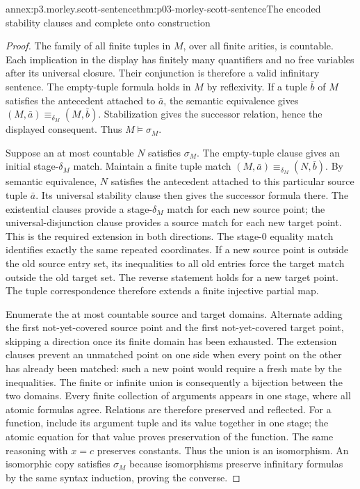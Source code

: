 \begin{annexitem}{annex:p3.morley.scott-sentence}{thm:p03-morley-scott-sentence}{The encoded stability clauses and complete onto construction}
\begin{proof}
The family of all finite tuples in \(M\), over all
finite arities, is countable.
Each implication in the display has finitely many
quantifiers and no free variables after its universal
closure. Their conjunction is therefore a valid
infinitary sentence.
The empty-tuple formula holds in \(M\) by reflexivity.
If a tuple \(\bar b\) of \(M\) satisfies the antecedent
attached to \(\bar a\), the semantic equivalence
gives \((M,\bar a)\equiv_{\delta_M}(M,\bar b)\).
Stabilization gives the successor relation, hence
the displayed consequent. Thus \(M\models\sigma_M\).

Suppose an at most countable \(N\) satisfies \(\sigma_M\).
The empty-tuple clause gives an initial
stage-\(\delta_M\) match.
Maintain a finite tuple match
\((M,\bar a)\equiv_{\delta_M}(N,\bar b)\).
By semantic equivalence, \(N\) satisfies the
antecedent attached to this particular source
tuple \(\bar a\). Its universal stability clause
then gives the successor formula there.
The existential clauses provide a
stage-\(\delta_M\) match for each new source point;
the universal-disjunction clause provides a source
match for each new target point.
This is the required extension in both directions.
The stage-\(0\) equality match identifies exactly
the same repeated coordinates.
If a new source point is outside the old source
entry set, its inequalities to all old entries
force the target match outside the old target
set. The reverse statement holds for a new
target point. The tuple correspondence therefore
extends a finite injective partial map.

Enumerate the at most countable source and target
domains. Alternate adding the first not-yet-covered
source point and the first not-yet-covered target
point, skipping a direction once its finite domain
has been exhausted.
The extension clauses prevent an unmatched point
on one side when every point on the other has
already been matched: such a new point would
require a fresh mate by the inequalities.
The finite or infinite union is consequently
a bijection between the two domains.
Every finite collection of arguments appears in
one stage, where all atomic formulas agree.
Relations are therefore preserved and reflected.
For a function, include its argument tuple and
its value together in one stage; the atomic
equation for that value proves preservation of
the function. The same reasoning with \(x=c\)
preserves constants.
Thus the union is an isomorphism.
An isomorphic copy satisfies \(\sigma_M\) because
isomorphisms preserve infinitary formulas by
the same syntax induction, proving the converse.


\end{proof}
\end{annexitem}

